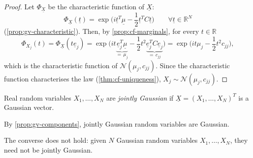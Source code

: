 \begin{proof}
Let $\Phi_{\underline X}$ be the characteristic function of $\underline X$:
\[
  \Phi_{\underline X}(\underline t)=\exp\Big(i\underline t^T\underline\mu-\frac12\underline t^TC\underline t\Big)
  \qquad\forall\underline t\in\mathbb R^N
\]
(\cref{prop:gv-characteristic}). Then, by \cref{prop:cf-marginals}, for every $t\in\mathbb R$
\[
  \Phi_{X_j}(t)=\Phi_{\underline X}(t\underline e_j)
  =\exp\Big(it\underbrace{\underline e_j^T\underline\mu}_{=\,\mu_j}-\frac12t^2\underbrace{\underline e_j^TC\underline e_j}_{=\,c_{jj}}\Big)
  =\exp\Big(it\mu_j-\frac12t^2c_{jj}\Big),
\]
which is the characteristic function of $\mathcal N(\mu_j,c_{jj})$. Since the characteristic
function characterises the law (\cref{thm:cf-uniqueness}), $X_j\sim\mathcal N(\mu_j,c_{jj})$.
\end{proof}

\begin{definition}\label{def:gv-jointly-gaussian}
Real random variables $X_1,\dots,X_N$ are \emph{jointly Gaussian} if
$\underline X=(X_1,\dots,X_N)^T$ is a Gaussian vector.
\end{definition}

By \cref{prop:gv-components}, jointly Gaussian random variables are Gaussian.

\begin{remark}\label{rem:gv-converse}
The converse does not hold: given $N$ Gaussian random variables $X_1,\dots,X_N$, they need not be
jointly Gaussian.
\end{remark}

